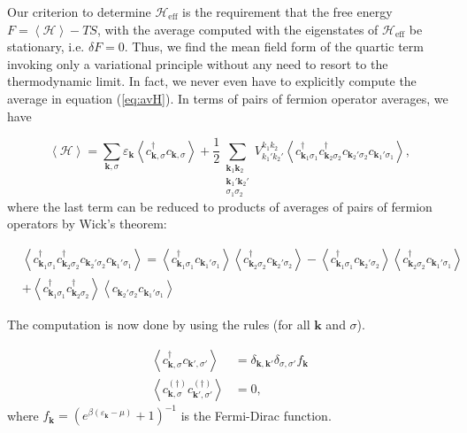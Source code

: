 Our criterion to determine $\mathcal{H}_{\text{eff}}$ is the requirement that the free energy $F = \left\langle \mathcal{H} \right\rangle - TS$, with the average computed with the eigenstates of $\mathcal{H}_{\text{eff}}$ be stationary, i.e. $\delta F = 0$. Thus, we find the mean field form of the quartic term invoking only a variational principle without any need to resort to the thermodynamic limit. In fact, we never even have to explicitly compute the average in equation (\ref{eq:avH}). In terms of pairs of fermion operator averages, we have 

\begin{equation}
\left\langle \mathcal{H} \right\rangle = \sum_{\bm k, \sigma} \varepsilon_{\bm k} \left\langle c_{\bm k, \sigma}^\dagger c_{\bm k, \sigma} \right\rangle + \frac{1}{2} \sum_{\substack{\bm k_1 \bm k_2 \\ \bm k_1' \bm k_2' \\  \sigma_1 \sigma_2}} V_{k_1' k_2'}^{k_1 k_2} \left\langle c_{\bm k_1 \sigma_1}^\dagger c_{\bm k_2 \sigma_2}^\dagger c_{\bm k_2' \sigma_2} c_{\bm k_1' \sigma_1} \right\rangle ,
\end{equation}
where the last term can be reduced to products of averages of pairs of fermion operators by Wick's theorem:

\begin{equation}
\begin{split}
&\left\langle c_{\bm k_1 \sigma_1}^\dagger c_{\bm k_2 \sigma_2}^\dagger c_{\bm k_2' \sigma_2} c_{\bm k_1' \sigma_1} \right\rangle = \left\langle c_{\bm k_1 \sigma_1}^\dagger c_{\bm k_1' \sigma_1} \right\rangle  \left\langle c_{\bm k_2 \sigma_2}^\dagger c_{\bm k_2' \sigma_2} \right\rangle - \left\langle c_{\bm k_1 \sigma_1}^\dagger c_{\bm k_2' \sigma_2} \right\rangle  \left\langle c_{\bm k_2 \sigma_2}^\dagger c_{\bm k_1' \sigma_1} \right\rangle \\
& + \left\langle c_{\bm k_1 \sigma_1}^\dagger c_{\bm k_2 \sigma_2}^\dagger \right\rangle \left\langle c_{\bm k_2' \sigma_2} c_{\bm k_1' \sigma_1} \right\rangle
\end{split}
\end{equation}

The computation is now done by using the rules (for all $\bm k$ and $\sigma$).

\begin{equation}\label{eq:rules}
\begin{split}
\left\langle c_{\bm k, \sigma}^\dagger c_{\bm k', \sigma'} \right\rangle &= \delta_{\bm k, \bm k'} \delta_{\sigma, \sigma'} f_{\bm k} \\
\left\langle c_{\bm k, \sigma}^{(\dagger)} c_{\bm k', \sigma'}^{(\dagger)} \right\rangle &= 0 ,
\end{split}
\end{equation}
where $f_{\bm k} = (e^{\beta(\varepsilon_{\bm k} - \mu)} +1 )^{-1}$ is the Fermi-Dirac function.

